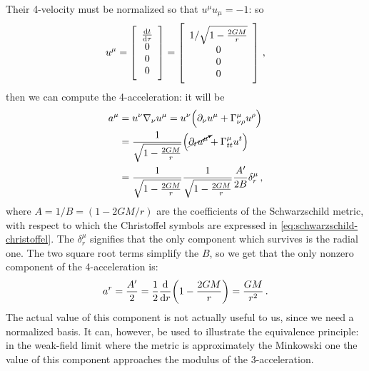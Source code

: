 \documentclass[main.tex]{subfiles}
\begin{document}
Their 4-velocity must be normalized so that \(u^{\mu } u_{\mu }= -1\): so 
%
\begin{subequations}
\begin{align}
  u^{\mu } = \left[\begin{array}{c}
  \dv{t}{\tau } \\ 
  0 \\ 
  0 \\ 
  0
  \end{array}\right]
  = 
  \left[\begin{array}{c}
  1/\sqrt{1 - \frac{2GM}{r}} \\ 
  0 \\ 
  0 \\ 
  0
  \end{array}\right]
\,,
\end{align}
\end{subequations}
%
then we can compute the 4-acceleration: it will be 
%
\begin{subequations}
\begin{align}
  a^{\mu } &= u^{\nu } \nabla_{\nu } u^{\mu }
  = u^{\nu } \qty(\partial_{\nu } u^{\mu } + \Gamma^{\mu }_{\nu \rho } u^{\rho })  \\
  &= \frac{1}{\sqrt{1 - \frac{2GM}{r}}} \qty(\cancelto{}{\partial_{t} u^{\mu }} + \Gamma^{\mu }_{tt} u^{t})  \\
  &= \frac{1}{\sqrt{1-\frac{2GM}{r}}}
  \frac{1}{\sqrt{1-\frac{2GM}{r}}} \frac{A'}{2B} \delta^{\mu }_{r}
\,,
\end{align}
\end{subequations}
%
where \(A = 1/B = (1 - 2GM/r)\) are the coefficients of the Schwarzschild metric, with respect to which the Christoffel symbols are expressed in \eqref{eq:schwarzschild-christoffel}. 
The \(\delta^{\mu }_{r}\) signifies that the only component which survives is the radial one.
The two square root terms simplify the \(B\), so we get that the only nonzero component of the 4-acceleration is:
%
\begin{align}
  a^{r} = \frac{A^{\prime }}{2} =
  \frac{1}{2} \dv{}{r} \qty(1 - \frac{2GM}{r})
  = \frac{GM}{r^2}
\,.
\end{align}
%
The actual value of this component is not actually useful to us, since we need a normalized basis.
It can, however, be used to illustrate the equivalence principle: in the weak-field limit where the metric is approximately the Minkowski one the value of this component approaches the modulus of the 3-acceleration. 
\end{document}
